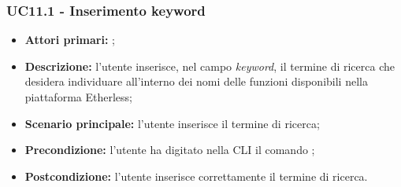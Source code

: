 \subsubsection{UC11.1 - Inserimento keyword}
\begin{itemize}
	\item \textbf{Attori primari:} \ua{};
	\item \textbf{Descrizione:} l’utente inserisce, nel campo \textit{keyword}, il termine di ricerca che desidera individuare all’interno dei nomi delle funzioni disponibili nella piattaforma Etherless; 
	\item \textbf{Scenario principale:} l'utente inserisce il termine di ricerca;
	\item \textbf{Precondizione:} l’utente ha digitato nella CLI il comando \search{};
	\item \textbf{Postcondizione:} l’utente inserisce correttamente il termine di ricerca. 
\end{itemize}